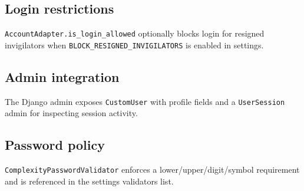 \subsection{Login restrictions}
\label{subsec:accounts:restrictions}

\texttt{AccountAdapter.is\_login\_allowed} optionally blocks login for resigned invigilators when \texttt{BLOCK\_RESIGNED\_INVIGILATORS} is enabled in settings.

\subsection{Admin integration}
\label{subsec:accounts:admin}

The Django admin exposes \texttt{CustomUser} with profile fields and a \texttt{UserSession} admin for inspecting session activity.

\subsection{Password policy}
\label{subsec:accounts:passwords}

\texttt{ComplexityPasswordValidator} enforces a lower/upper/digit/symbol requirement and is referenced in the settings validators list.
